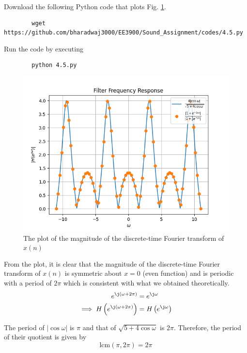 \documentclass[journal,12pt,twocolumn]{IEEEtran}
\providecommand{\brak}[1]{\ensuremath{\left(#1\right)}}
\providecommand{\abs}[1]{\left\vert#1\right\vert}
\numberwithin{equation}{section}
\renewcommand\thesection{\arabic{section}}
\begin{document}
\begin{enumerate}[label=\thesection.\arabic*]
	Download the following Python code that plots Fig. \ref{fig-4.5}.
	\begin{lstlisting}
		wget https://github.com/bharadwaj3000/EE3900/Sound_Assignment/codes/4.5.py
	\end{lstlisting}
	
	Run the code by executing
	\begin{lstlisting}
		python 4.5.py
	\end{lstlisting}

	\begin{figure}[!ht]
		\centering
		\includegraphics[width=\columnwidth]{./figs/4.5.png}
		\caption{The plot of the magnitude of the discrete-time Fourier transform of $x(n)$}
		\label{fig-4.5}	
	\end{figure}

	From the plot, it is clear that the magnitude of the discrete-time Fourier transform of $x(n)$ is symmetric about $x = 0$ (even function) and is periodic with a period of $2\pi$ which is consistent with what we obtained theoretically.
	\begin{align}
		e^{\j \brak{\omega + 2\pi}} &= e^{\j \omega} \\
		\implies H\brak{e^{\j \brak{\omega + 2\pi}}} &= H\brak{e^{\j \omega}}
	\end{align}	 
	
	The period of $\abs{\cos\omega}$ is $\pi$ and that of $\sqrt{5 + 4\cos\omega}$ is $2\pi$. Therefore, the period of their quotient is given by
	\begin{equation}
		\textrm{lcm}(\pi, 2\pi) = 2\pi
	\end{equation}
	

\end{enumerate}
\end{document}
